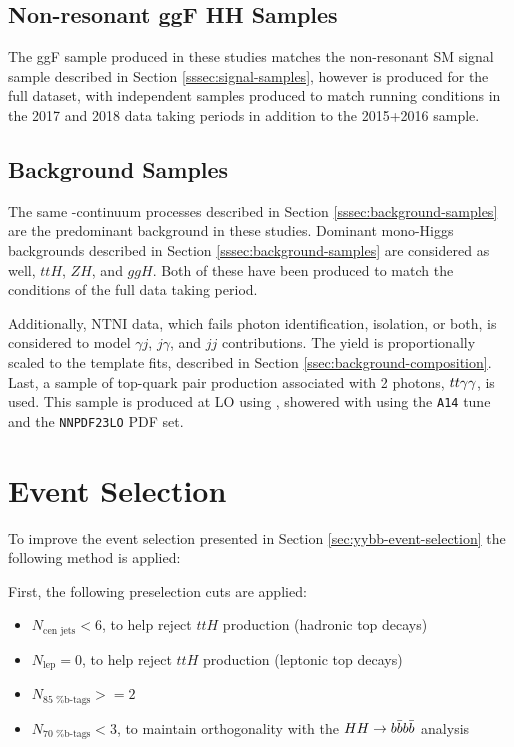 \subsection{Non-resonant ggF HH Samples}

The ggF \hh sample produced in these studies matches the non-resonant \gls{SM} signal sample described in Section \ref{sssec:signal-samples}, however is produced for the full \RunTwo dataset, with independent samples produced to match running conditions in the 2017 and 2018 data taking periods in addition to the 2015+2016 sample.

\subsection{Background Samples} \label{ssec:vbf-bkg-samples}

The same \yy-continuum processes described in Section \ref{sssec:background-samples} are the predominant background in these studies. Dominant mono-Higgs backgrounds described in Section \ref{sssec:background-samples} are considered as well, $ttH$, $ZH$, and $ggH$. Both of these have been produced to match the conditions of the full \RunTwo data taking period.

Additionally, \gls{NTNI} data, which fails photon identification, isolation, or both, is considered to model $\gamma j$, $j \gamma$, and $jj$ contributions. The yield is proportionally scaled to the template fits, described in Section \ref{ssec:background-composition}. Last, a sample of top-quark pair production associated with 2 photons, $tt \gamma\gamma$, is used. This sample is produced at \gls{LO} using \MADGRAPH, showered with \peight using the \texttt{A14} tune and the \texttt{NNPDF23LO} PDF set.


\section{Event Selection} \label{ssec:vbf-event-selection}

To improve the event selection presented in Section \ref{sec:yybb-event-selection} the following method is applied:

First, the following preselection cuts are applied:

\begin{itemize}
	\item $N_{\text{cen jets}} < 6$, to help reject $ttH$ production (hadronic top decays)
	\item $N_{\text{lep}} = 0$, to help reject $ttH$ production (leptonic top decays)
	\item $N_{\text{85 \% b-tags}} >= 2$ 
	\item $N_{\text{70 \% b-tags}} < 3$, to maintain orthogonality with the $HH \rightarrow b\bar{b}b\bar{b}$ analysis
\end{itemize}

